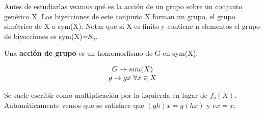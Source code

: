 \documentclass{article}
\begin{document}
Antes de estudiarlas veamos qué es la acción de un grupo sobre un conjunto genérico X. Las biyecciones de este conjunto X forman un grupo, el grupo simétrico de X o sym(X). Notar que si X es finito y contiene n elementos el grupo de biyecciones es sym(X)=$S_n$.

\smallskip
Una \textbf{acción de grupo} es un homomorfismo de G en sym(X).

$$\begin{array}{c}
     G \to sim(X)  \\
     g\to gx \hspace{0.1cm} \forall x\in X
\end{array}$$

Se suele escribir como multiplicación por la izquierda en lugar de $f_g(X)$. Automáticamente vemos que se satisface que $(gh)x=g(hx)$ y $ex=x$.
\end{document}
